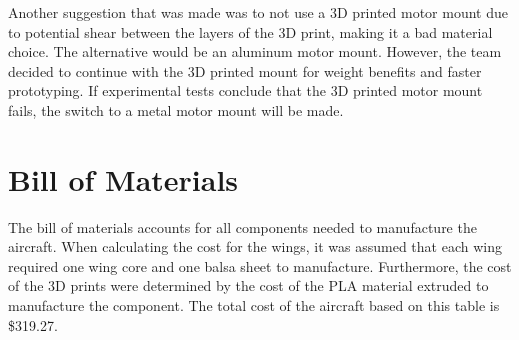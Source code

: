     Another suggestion that was made was to not use a 3D printed motor mount due to potential shear between the layers of the 3D print, making it a bad material choice. The alternative would be an aluminum motor mount. However, the team decided to continue with the 3D printed mount for weight benefits and faster prototyping. If experimental tests conclude that the 3D printed motor mount fails, the switch to a metal motor mount will be made.

\section{Bill of Materials}

    The bill of materials accounts for all components needed to manufacture the aircraft. When calculating the cost for the wings, it was assumed that each wing required one wing core and one balsa sheet to manufacture. Furthermore, the cost of the 3D prints were determined by the cost of the PLA material extruded to manufacture the component. The total cost of the aircraft based on this table is \$319.27.
    
